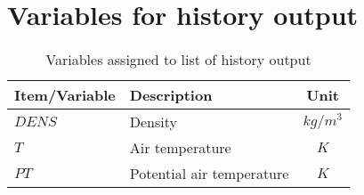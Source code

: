 \chapter{Variables for history output}
\label{app:vari_hist}

\begin{table}[htb]
  \label{tb:vari_hist}
  \caption{Variables assigned to list of history output}
  \begin{tabularx}{150mm}{|l|X|c|} \hline
  \rowcolor[gray]{0.9} Item/Variable & Description  & Unit \\ \hline
    $DENS$ & Density                       &  $kg/m^3$ \\ \hline
    $T$    & Air temperature               &  $K$   \\ \hline
    $PT$   & Potential air temperature     &  $K$   \\ \hline
  \end{tabularx}
\end{table}

